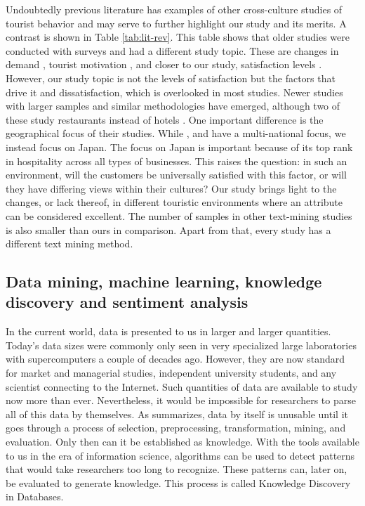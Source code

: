 \documentclass[smallextended,natbib]{svjour3}       %
\begin{document}
    Undoubtedly previous literature has examples of other cross-culture studies of tourist behavior and may serve to further highlight our study and its merits. A contrast is shown in Table \ref{tab:lit-rev}. This table shows that older studies were conducted with surveys and had a different study topic. These are changes in demand \cite[][]{bauer1993changing}, tourist motivation \cite[][]{kim2000}, and closer to our study, satisfaction levels \cite[][]{choi2000}. However, our study topic is not the levels of satisfaction but the factors that drive it and dissatisfaction, which is overlooked in most studies. Newer studies with larger samples and similar methodologies have emerged, although two of these study restaurants instead of hotels \cite[][]{JIA2020104071, HUANG2017117}. One important difference is the geographical focus of their studies. While \cite{FRANCESCO201924} , \cite{JIA2020104071} and \cite{HUANG2017117} have a multi-national focus, we instead focus on Japan. The focus on Japan is important because of its top rank in hospitality across all types of businesses. This raises the question: in such an environment, will the customers be universally satisfied with this factor, or will they have differing views within their cultures? Our study brings light to the changes, or lack thereof, in different touristic environments where an attribute can be considered excellent. The number of samples in other text-mining studies is also smaller than ours in comparison. Apart from that, every study has a different text mining method.

  \subsection{Data mining, machine learning, knowledge discovery and sentiment analysis}\label{theory_data}

    In the current world, data is presented to us in larger and larger quantities. Today's data sizes were commonly only seen in very specialized large laboratories with supercomputers a couple of decades ago. However, they are now standard for market and managerial studies, independent university students, and any scientist connecting to the Internet. Such quantities of data are available to study now more than ever. Nevertheless, it would be impossible for researchers to parse all of this data by themselves. As \cite{fayyad1996data} summarizes, data by itself is unusable until it goes through a process of selection, preprocessing, transformation, mining, and evaluation. Only then can it be established as knowledge. With the tools available to us in the era of information science, algorithms can be used to detect patterns that would take researchers too long to recognize. These patterns can, later on, be evaluated to generate knowledge. This process is called Knowledge Discovery in Databases. 
\end{document}
